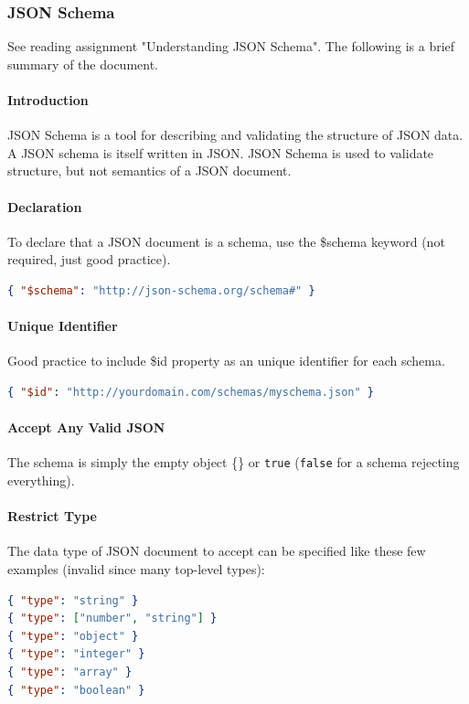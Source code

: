 \subsubsection{JSON Schema}

See reading assignment "Understanding JSON Schema". The following is a brief summary of the document.

\paragraph{Introduction}
JSON Schema is a tool for describing and validating the structure of JSON data. A JSON schema is itself written in JSON. JSON Schema is used to validate structure, but not semantics of a JSON document.

\paragraph{Declaration}
To declare that a JSON document is a schema, use the \$schema keyword (not required, just good practice).
\begin{lstlisting}[language=json,firstnumber=1]
{ "$schema": "http://json-schema.org/schema#" }
\end{lstlisting}

\paragraph{Unique Identifier}
Good practice to include \$id property as an unique identifier for each schema. %
\begin{lstlisting}[language=json,firstnumber=1]
{ "$id": "http://yourdomain.com/schemas/myschema.json" }
\end{lstlisting}

\paragraph{Accept Any Valid JSON}
The schema is simply the empty object \{\} or \texttt{true} (\texttt{false} for a schema rejecting everything).

\paragraph{Restrict Type}
The data type of JSON document to accept can be specified like these few examples (invalid since many top-level types):
\begin{lstlisting}[language=json,firstnumber=1]
{ "type": "string" }
{ "type": ["number", "string"] }
{ "type": "object" }
{ "type": "integer" }
{ "type": "array" }
{ "type": "boolean" }
\end{lstlisting}

